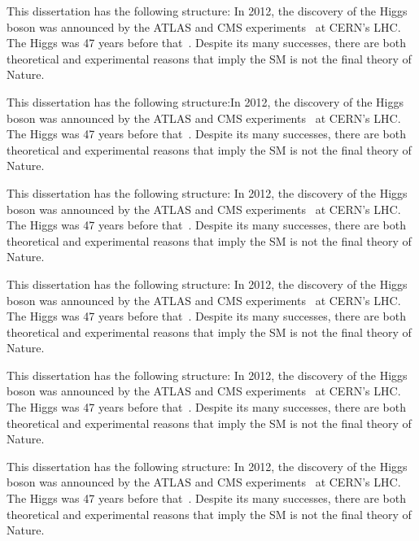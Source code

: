 This dissertation has the following structure:
In 2012, the discovery of the Higgs boson was announced by the ATLAS and CMS experiments~\cite{Higgs_discovery_2012_CMS,Higgs_discovery_2012_ATLAS,Higgs_discovery_2013_CMS} at CERN's LHC.
The Higgs was 47 years before that~\cite{Higgs_theory1,Higgs_theory2}.
Despite its many successes, there are both theoretical and experimental reasons that imply the SM is not the final theory of Nature.

This dissertation has the following structure:In 2012, the discovery of the Higgs boson was announced by the ATLAS and CMS experiments~\cite{Higgs_discovery_2012_CMS,Higgs_discovery_2012_ATLAS,Higgs_discovery_2013_CMS} at CERN's LHC.
The Higgs was 47 years before that~\cite{Higgs_theory1,Higgs_theory2}.
Despite its many successes, there are both theoretical and experimental reasons that imply the SM is not the final theory of Nature.

This dissertation has the following structure:
In 2012, the discovery of the Higgs boson was announced by the ATLAS and CMS experiments~\cite{Higgs_discovery_2012_CMS,Higgs_discovery_2012_ATLAS,Higgs_discovery_2013_CMS} at CERN's LHC.
The Higgs was 47 years before that~\cite{Higgs_theory1,Higgs_theory2}.
Despite its many successes, there are both theoretical and experimental reasons that imply the SM is not the final theory of Nature.

This dissertation has the following structure:
In 2012, the discovery of the Higgs boson was announced by the ATLAS and CMS experiments~\cite{Higgs_discovery_2012_CMS,Higgs_discovery_2012_ATLAS,Higgs_discovery_2013_CMS} at CERN's LHC.
The Higgs was 47 years before that~\cite{Higgs_theory1,Higgs_theory2}.
Despite its many successes, there are both theoretical and experimental reasons that imply the SM is not the final theory of Nature.

This dissertation has the following structure:
In 2012, the discovery of the Higgs boson was announced by the ATLAS and CMS experiments~\cite{Higgs_discovery_2012_CMS,Higgs_discovery_2012_ATLAS,Higgs_discovery_2013_CMS} at CERN's LHC.
The Higgs was 47 years before that~\cite{Higgs_theory1,Higgs_theory2}.
Despite its many successes, there are both theoretical and experimental reasons that imply the SM is not the final theory of Nature.

This dissertation has the following structure:
In 2012, the discovery of the Higgs boson was announced by the ATLAS and CMS experiments~\cite{Higgs_discovery_2012_CMS,Higgs_discovery_2012_ATLAS,Higgs_discovery_2013_CMS} at CERN's LHC.
The Higgs was 47 years before that~\cite{Higgs_theory1,Higgs_theory2}.
Despite its many successes, there are both theoretical and experimental reasons that imply the SM is not the final theory of Nature.

